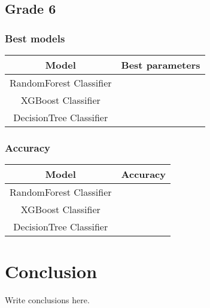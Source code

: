 \documentclass[12pt,a4paper,openright,twoside]{book}
\begin{document}
\section{Grade 6}
\subsection{Best models}
\begin{tabular}{|c|c|}
    \hline
    \textbf{Model} & \textbf{Best parameters} \\
    \hline
    RandomForest Classifier  &  \\
    \hline
    XGBoost Classifier & \\
    \hline
    DecisionTree Classifier &  \\
    \hline
\end{tabular}

\subsection{Accuracy}
\begin{tabular}{|c|c|}
    \hline
    \textbf{Model} & \textbf{Accuracy} \\
    \hline
    RandomForest Classifier  &  \\
    \hline
    XGBoost Classifier & \\
    \hline
    DecisionTree Classifier &  \\
    \hline
\end{tabular}

\chapter{Conclusion}
\label{chap:conclusions}

Write conclusions here.



\backmatter




\end{document}
